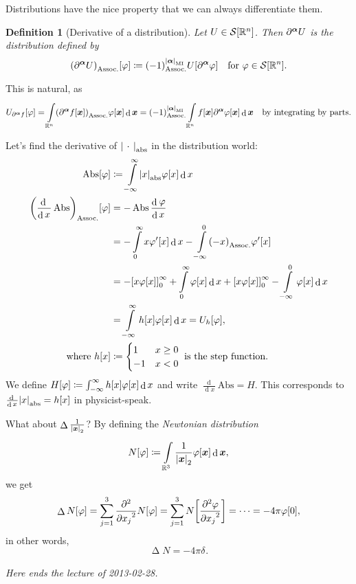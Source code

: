 \documentclass[10pt]{article}
\newtheorem*{definition}{Definition}
\DeclarePairedDelimiter\singleBars{\lvert}{\rvert}
\DeclarePairedDelimiter\parentheses{\lparen}{\rparen}
\DeclarePairedDelimiter\squareBrackets{[}{]}
\newcommand{\Dirac}[1][]{\delta_{#1}}
\DeclareMathOperator{\AbsDistrib}{Abs}
\DeclareMathOperator{\Laplacian}{\Delta}
\DeclareMathOperator{\diffd}{d}
\newcommand{\der}{'}
\newcommand\deriv[3][]{\frac{\diffd^{#1} {#3}}{{\diffd {#2}}^{#1}}}
\newcommand{\derivop}[2][]{\deriv[#1]{#2}{}}
\newcommand\pderiv[3][]{\frac{\partial^{#1} #3}{{\partial {#2}}^{#1}}}
\newcommand{\pderivop}[2][]{\pderiv[#1]{#2}{}}
\newcommand{\pdop}[1]{\partial^{#1}}
\newcommand{\R}{\mathbb{R}}
\newcommand{\SchwartzSpace}{\mathcal{S}}
\newcommand\of[1]{\parentheses*{#1}}
\newcommand\pa[1]{\parentheses*{#1}}
\newcommand\abs[1]{\singleBars*{#1}}
\newcommand\norm[1]{\singleBars*{#1}}
\newcommand\total[1]{\singleBars*{#1}}
\newcommand{\diff}[3]{\squareBrackets*{#3}_{#1}^{#2}}
\newcommand\gj\varphi
\newcommand{\vx}{{\vectorsym x}}
\newcommand{\miga}{{\vectorsym \alpha}}
\newcommand\placeholder{\,\:\cdot\:\,}
\renewcommand\pa[1]{\parentheses*{#1}_\mathrm{Assoc.}}
\renewcommand\of[1]{\squareBrackets*{#1}}
\renewcommand\total[1]{\singleBars*{#1}_{\mathrm{MI}}}
\renewcommand\norm[1]{\singleBars*{#1}_{2}}
\renewcommand\abs[1]{\singleBars*{#1}_{\mathrm{abs}}}
\newcommand{\Rn}{{\R^n}}
\newcommand{\Schwartz}{{\SchwartzSpace\of{\Rn}}}
\newcommand{\lectureEnd}[1]{

\emph{Here ends the lecture of #1.}

}
\begin{document}
  Distributions have the nice property that we can always differentiate them.
  \begin{definition}[Derivative of a distribution]
    Let $U\in\Schwartz$. Then $\pdop\miga U$ is the distribution defined
    by 
    \begin{equation*}
      \pa{\pdop\miga U}\of{\gj} \coloneqq \pa{-1}^{\total{\miga}} U\of{\pdop\miga\gj}\quad
      \text{for }\gj \in \Schwartz.
    \end{equation*}
  \end{definition}
      This is natural, as
  \begin{align*}
    U_{\pdop\miga f}\of\gj 
    = \int\Rn\pa{\pdop\miga f\of\vx} \gj\of\vx \diffd{\vx} 
    = \pa{-1}^{\total{\miga}} \int\Rn f\of\vx \partial^\miga \gj\of\vx \diffd{\vx} 
    && \text{by integrating by parts.}
  \end{align*}

  Let's find the derivative of $\abs{\placeholder}$ in the distribution world:
  \begin{align*}
    \AbsDistrib\of\gj &\coloneqq \int{-\infty}[\infty] \abs{x} \gj\of{x} \diffd{x}\\
    \pa{\derivop x \AbsDistrib}\of\gj &= - \AbsDistrib  \deriv x \gj\\
    &= - \int0[\infty] x \gj\der\of{x} \diffd{x} - \int{-\infty}[0]\pa{-x}\gj\der\of{x} \\
    &= - \diff 0 \infty {x \gj\of{x}} + \int0[\infty] \gj\of{x} \diffd{x} + 
    \diff 0 \infty {x \gj\of{x}} - \int{-\infty}[0] \gj\of{x} \diffd{x} \\
    &= \int{-\infty}[\infty] h\of{x} \gj\of{x} \diffd{x} = U_h\of\gj,\\
    \text{where } h\of{x} &\coloneqq
	\begin{cases}
		1  & x \geq 0 \\
		-1 & x < 0
	\end{cases}
    \text{ is the step function}.
  \end{align*}
We define $H\of\gj \coloneqq \int{-\infty}[\infty] h\of{x} \gj\of{x} \diffd{x}$ and write $\derivop x \mathrm{Abs} = H$. This corresponds to $\derivop x \abs{x} = h\of{x}$ in physicist-speak.

  What about $\Laplacian\frac{1}{\norm{\vx}}$? By defining the \emph{Newtonian distribution}
  \begin{equation*}
    N\of\gj \coloneqq \int{\R^3} \frac{1}{\norm{\vx}} \gj\of\vx \diffd{\vx},
  \end{equation*}
  we get
  \begin{equation*}
    \Laplacian{N}\of\gj = \sum{j = 1}[3] \pderivop[2]{x_j}N\of\gj = \sum{j = 1}[3]  N\of{\pderiv[2]{x_j}\gj} = \dotsb = -4 \pi \gj\of{0},
  \end{equation*}
  in other words,
  \begin{equation*}
    \Laplacian N = -4 \pi \Dirac.
  \end{equation*}
  \lectureEnd{2013-02-28}
\end{document}
